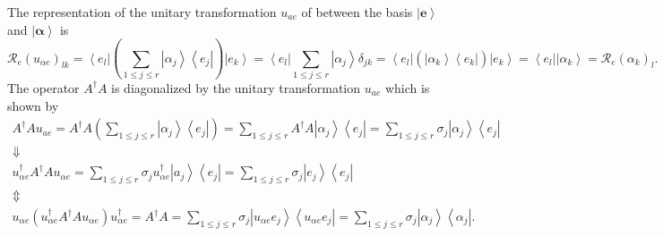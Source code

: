 \documentclass[aps,preprint]{revtex4}%
\begin{document}
The representation of the unitary transformation $u_{ae}$ of between the basis
$\left\vert \mathbf{e}\right\rangle $ and $\left\vert \mathbf{\alpha
}\right\rangle $ is
\begin{equation}
\mathcal{R}_{e}\left(  u_{\alpha e}\right)  _{lk}=\left\langle e_{l}%
\right\vert \left(  \sum_{1\leq j\leq r}\left\vert \alpha_{j}\right\rangle
\left\langle e_{j}\right\vert \right)  \left\vert e_{k}\right\rangle
=\left\langle e_{l}\right\vert \sum_{1\leq j\leq r}\left\vert \alpha
_{j}\right\rangle \delta_{jk}=\left\langle e_{l}\right\vert \left(
\overset{}{\left\vert \alpha_{k}\right\rangle \left\langle e_{k}\right\vert
}\right)  \left\vert e_{k}\right\rangle =\left\langle e_{l}\right\vert
\left\vert \alpha_{k}\right\rangle =\mathcal{R}_{e}\left(  \alpha_{k}\right)
_{l}.
\end{equation}
The operator $A^{\dagger}A$ is diagonalized by the unitary transformation
$u_{ae}$ which is shown by
\begin{gather}
A^{\dagger}Au_{ae}=A^{\dagger}A\left(  \sum_{1\leq j\leq r}\left\vert
\alpha_{j}\right\rangle \left\langle e_{j}\right\vert \right)  =\sum_{1\leq
j\leq r}A^{\dagger}A\left\vert \alpha_{j}\right\rangle \left\langle
e_{j}\right\vert =\sum_{1\leq j\leq r}\sigma_{j}\left\vert \alpha
_{j}\right\rangle \left\langle e_{j}\right\vert \\
\Downarrow\\
u_{\alpha e}^{\dagger}A^{\dagger}Au_{\alpha e}=\sum_{1\leq j\leq r}\sigma
_{j}u_{\alpha e}^{\dagger}\left\vert a_{j}\right\rangle \left\langle
e_{j}\right\vert =\sum_{1\leq j\leq r}\sigma_{j}\left\vert e_{j}\right\rangle
\left\langle e_{j}\right\vert \\
\Updownarrow\\
u_{\alpha e}\left(  u_{\alpha e}^{\dagger}A^{\dagger}Au_{\alpha e}\right)
u_{\alpha e}^{\dagger}=A^{\dagger}A=\sum_{1\leq j\leq r}\sigma_{j}\left\vert
u_{\alpha e}e_{j}\right\rangle \left\langle u_{\alpha e}e_{j}\right\vert
=\sum_{1\leq j\leq r}\sigma_{j}\left\vert \alpha_{j}\right\rangle \left\langle
\alpha_{j}\right\vert .
\end{gather}
\end{document}
